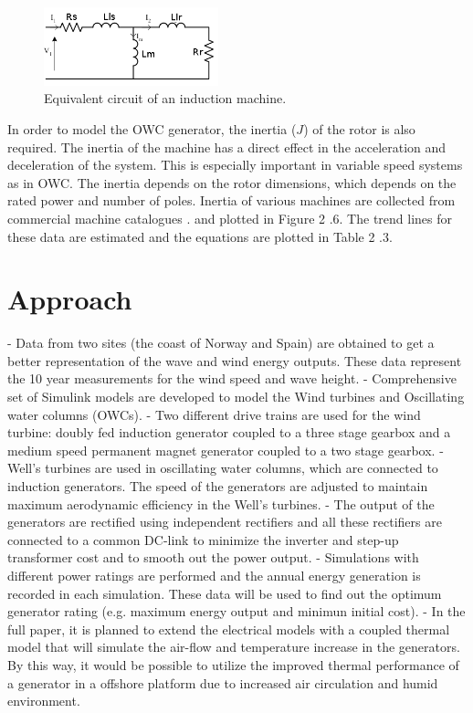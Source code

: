 \documentclass[twocolumn]{article}
\begin{document}
  \begin{figure}
    \centering
    \includegraphics[width=0.45\textwidth]{equivalent_circuit}
    \caption{Equivalent circuit of an induction machine.} 
    \label{equivalent_circuit}
  \end{figure}


In order to model the OWC generator, the inertia ($J$) of the rotor is also required. The inertia of the machine has a direct effect in the acceleration and deceleration of the system. This is especially important in variable speed systems as in OWC. The inertia depends on the rotor dimensions, which depends on the rated power and number of poles. Inertia of various machines are collected from commercial machine catalogues \cite{Siemens2012}. and plotted in Figure  2 .6. The trend lines for these data are estimated and the equations are plotted in Table  2 .3.


\section{Approach}
- Data from two sites (the coast of Norway and Spain) are obtained to get a better representation of the wave and wind energy outputs. These data represent the 10 year measurements for the wind speed and wave height.
- Comprehensive set of Simulink models are developed to model the Wind turbines and Oscillating water columns (OWCs).
- Two different drive trains are used for the wind turbine: doubly fed induction generator coupled to a three stage gearbox and a medium speed permanent magnet generator coupled to a two stage gearbox.
- Well's turbines are used in oscillating water columns, which are connected to induction generators. The speed of the generators are adjusted to maintain maximum aerodynamic efficiency in the Well's turbines.
- The output of the generators are rectified using independent rectifiers and all these rectifiers are connected to a common DC-link to minimize the inverter and step-up transformer cost and to smooth out the power output.
- Simulations with different power ratings are performed and the annual energy generation is recorded in each simulation. These data will be used to find out the optimum generator rating (e.g. maximum energy output and minimun initial cost).
- In the full paper, it is planned to extend the electrical models with a coupled thermal model that will simulate the air-flow and temperature increase in the generators. By this way, it would be possible to utilize the improved thermal performance of a generator in a offshore platform due to increased air circulation and humid environment.
\end{document}
